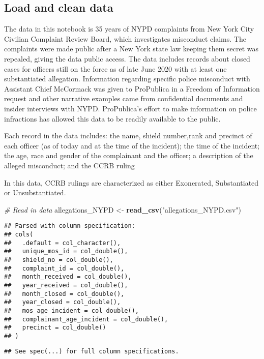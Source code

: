 \documentclass[
]{article}
\newenvironment{Shaded}{\begin{snugshade}}{\end{snugshade}}
\newcommand{\CommentTok}[1]{\textcolor[rgb]{0.56,0.35,0.01}{\textit{#1}}}
\newcommand{\KeywordTok}[1]{\textcolor[rgb]{0.13,0.29,0.53}{\textbf{#1}}}
\newcommand{\NormalTok}[1]{#1}
\newcommand{\StringTok}[1]{\textcolor[rgb]{0.31,0.60,0.02}{#1}}
\begin{document}
\hypertarget{load-and-clean-data}{%
\subsection{Load and clean data}\label{load-and-clean-data}}

The data in this notebook is 35 years of NYPD complaints from New York
City Civilian Complaint Review Board, which investigates misconduct
claims. The complaints were made public after a New York state law
keeping them secret was repealed, giving the data public access. The
data includes records about closed cases for officers still on the force
as of late June 2020 with at least one substantiated allegation.
Information regarding specific police misconduct with Assistant Chief
McCormack was given to ProPublica in a Freedom of Information request
and other narrative examples came from confidential documents and
insider interviews with NYPD. ProPublica's effort to make information on
police infractions has allowed this data to be readily available to the
public.

Each record in the data includes: the name, shield number,rank and
precinct of each officer (as of today and at the time of the incident);
the time of the incident; the age, race and gender of the complainant
and the officer; a description of the alleged misconduct; and the CCRB
ruling

In this data, CCRB rulings are characterized as either Exonerated,
Substantiated or Unsubstantiated.

\begin{Shaded}
\begin{Highlighting}[]
\CommentTok{# Read in data }
\NormalTok{allegations_NYPD <-}\StringTok{ }\KeywordTok{read_csv}\NormalTok{(}\StringTok{"allegations_NYPD.csv"}\NormalTok{)}
\end{Highlighting}
\end{Shaded}

\begin{verbatim}
## Parsed with column specification:
## cols(
##   .default = col_character(),
##   unique_mos_id = col_double(),
##   shield_no = col_double(),
##   complaint_id = col_double(),
##   month_received = col_double(),
##   year_received = col_double(),
##   month_closed = col_double(),
##   year_closed = col_double(),
##   mos_age_incident = col_double(),
##   complainant_age_incident = col_double(),
##   precinct = col_double()
## )
\end{verbatim}

\begin{verbatim}
## See spec(...) for full column specifications.
\end{verbatim}
\end{document}
